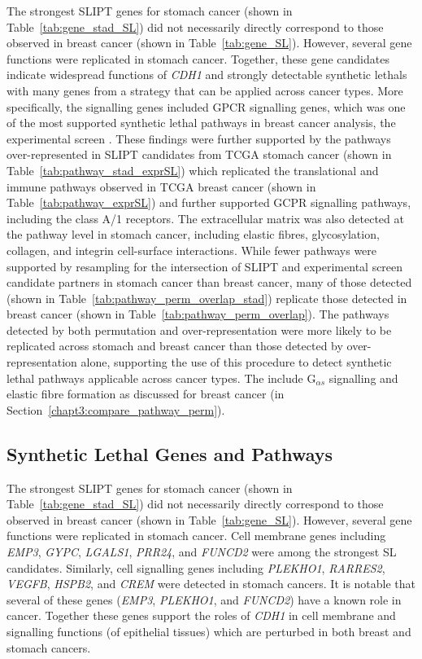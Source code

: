 The strongest \gls{SLIPT} genes for stomach cancer (shown in Table~\ref{tab:gene_stad_SL}) did not necessarily directly correspond to those observed in breast cancer (shown in Table~\ref{tab:gene_SL}). However, several gene functions were replicated in stomach cancer. Together, these gene candidates indicate widespread functions of \textit{CDH1} and strongly detectable \glspl{synthetic lethal} with many genes from a strategy that can be applied across cancer types. More specifically, the signalling genes included \gls{GPCR} signalling genes, which was one of the most supported \gls{synthetic lethal} pathways in breast cancer analysis, the experimental screen \citep{Telford2015}.%
These findings were further supported by the pathways over-represented in \gls{SLIPT} candidates from \gls{TCGA} stomach cancer (shown in Table~\ref{tab:pathway_stad_exprSL}) which replicated the translational and immune pathways observed in \gls{TCGA} breast cancer (shown in Table~\ref{tab:pathway_exprSL}) and further supported GCPR signalling pathways, including the class A/1 receptors. The extracellular matrix was also detected at the pathway level in stomach cancer, including elastic fibres, glycosylation, collagen, and integrin cell-surface interactions. 
While fewer pathways were supported by resampling for the intersection of \gls{SLIPT} and experimental screen \citep{Telford2015} candidate partners in stomach cancer than breast cancer, many of those detected (shown in Table~\ref{tab:pathway_perm_overlap_stad}) replicate those detected in breast cancer (shown in Table~\ref{tab:pathway_perm_overlap}). The pathways detected by both permutation and over-representation were more likely to be replicated across stomach and breast cancer than those detected by over-representation alone, supporting the use of this procedure to detect \gls{synthetic lethal} pathways applicable across cancer types. The include G$_{\alpha s}$ signalling and elastic fibre formation as discussed for breast cancer (in Section~\ref{chapt3:compare_pathway_perm}).

\iffalse
\subsection{Synthetic Lethal Genes and Pathways} \label{chapt3:stad_SL_genes}

The strongest \gls{SLIPT} genes for stomach cancer (shown in Table~\ref{tab:gene_stad_SL}) did not necessarily directly correspond to those observed in breast cancer (shown in Table~\ref{tab:gene_SL}). However, several gene functions were replicated in stomach cancer. Cell membrane genes including \textit{EMP3}, \textit{GYPC},  \textit{LGALS1}, \textit{PRR24},  and \textit{FUNCD2} were among the strongest SL candidates. Similarly, cell signalling genes including \textit{PLEKHO1}, \textit{RARRES2}, \textit{VEGFB}, \textit{HSPB2}, and \textit{CREM} were detected in stomach cancers. It is notable that several of these genes (\textit{EMP3}, \textit{PLEKHO1}, and \textit{FUNCD2}) have a known role in cancer. Together these genes support the roles of \textit{CDH1} in cell membrane and signalling functions (of epithelial tissues) which are perturbed in both breast and stomach cancers.

